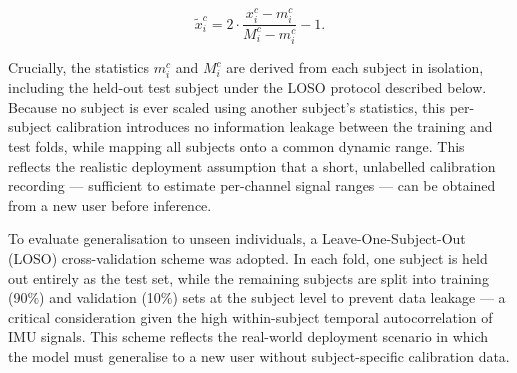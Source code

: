 \begin{equation}
    \tilde{x}_i^c = 2 \cdot \frac{x_i^c - m_i^c}{M_i^c - m_i^c} - 1.
    \label{eq:per_subject_minmax}
\end{equation}

\noindent Crucially, the statistics $m_i^c$ and $M_i^c$ are derived from each
subject in isolation, including the held-out test subject under the LOSO protocol
described below. Because no subject is ever scaled using another subject's
statistics, this per-subject calibration introduces no information leakage between
the training and test folds, while mapping all subjects onto a common dynamic range.
This reflects the realistic deployment assumption that a short, unlabelled
calibration recording --- sufficient to estimate per-channel signal ranges --- can
be obtained from a new user before inference.

To evaluate generalisation to unseen individuals, a Leave-One-Subject-Out (LOSO) 
cross-validation scheme was adopted. In each fold, one subject is held out entirely as 
the test set, while the remaining subjects are split into training (90\%) and validation 
(10\%) sets at the subject level to prevent data leakage --- a critical consideration 
given the high within-subject temporal autocorrelation of IMU signals. This scheme 
reflects the real-world deployment scenario in which the model must generalise to a new 
user without subject-specific calibration data.